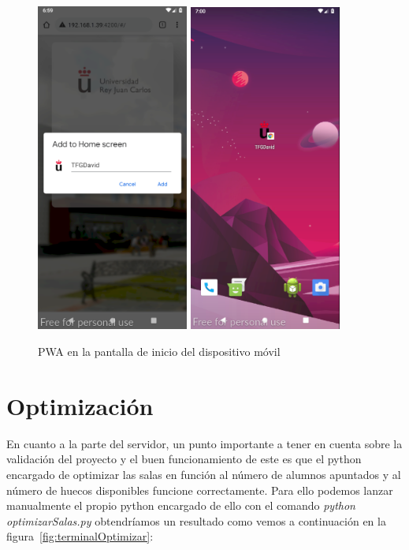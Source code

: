 \documentclass[a4paper, 12pt]{book}
\begin{document}
	\begin{figure}
  	\centering
  	\includegraphics[width=5cm, keepaspectratio]{img/addHomeMovil.png}
  	\includegraphics[width=5cm, keepaspectratio]{img/homeMovil.png}
  	\caption{PWA en la pantalla de inicio del dispositivo móvil}\label{fig:homeMovil}
	\end{figure} 
 
\section{Optimización}
En cuanto a la parte del servidor, un punto importante a tener en cuenta sobre la validación del proyecto y el buen funcionamiento de este es que el python encargado de optimizar las salas en función al número de alumnos apuntados y al número de huecos disponibles funcione correctamente. Para ello podemos lanzar manualmente el propio python encargado de ello con el comando \textit{python optimizarSalas.py} obtendríamos un resultado como vemos a continuación en la figura~\ref{fig:terminalOptimizar}:
 
\end{document}
